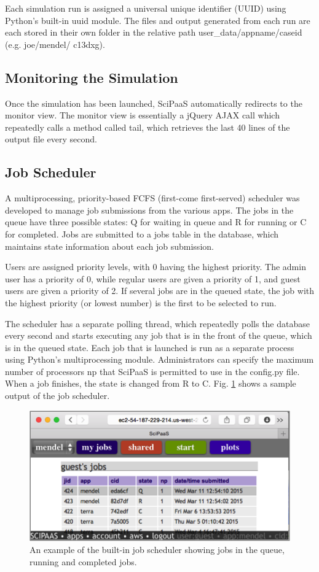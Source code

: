 \documentclass[10pt,reprint]{socc14}
\begin{document}
Each simulation run is assigned a universal unique identifier (UUID) using Python’s built-in uuid module.  The files and output generated from each run are each stored in their own folder in the relative path user\_data/appname/caseid (e.g. joe/mendel/ c13dxg).

\subsection{Monitoring the Simulation}

Once the simulation has been launched, SciPaaS automatically redirects to the monitor view.  The monitor view is essentially a jQuery AJAX call which repeatedly calls a method called tail, which retrieves the last 40 lines of the output file every second.  

\subsection{Job Scheduler}

A multiprocessing, priority-based FCFS (first-come first-served) scheduler was developed to manage job submissions from the various apps.  The jobs in the queue have three possible states: Q for waiting in queue and R for running or C for completed.  Jobs are submitted to a jobs table in the database, which maintains state information about each job submission. 

Users are assigned priority levels, with 0 having the highest priority.  The admin user has a priority of 0, while regular users are given a priority of 1, and guest users are given a priority of 2. If several jobs are in the queued state, the job with the highest priority (or lowest number) is the first to be selected to run.

The scheduler has a separate polling thread, which repeatedly polls the database every second and starts executing any job that is in the front of the queue, which is in the queued state.  Each job that is launched is run as a separate process using Python’s multiprocessing module.  Administrators can specify the maximum number of processors np that SciPaaS is permitted to use in the config.py file.  When a job finishes, the state is changed from R to C. Fig. \ref{sched} shows a sample output of the job scheduler.

\begin{figure}[t]
\centering
\includegraphics[natwidth=454,natheight=228]{figs/sched.png}
\caption{An example of the built-in job scheduler showing jobs in the queue, running and completed jobs. \label{sched}}
\end{figure}
\end{document}
